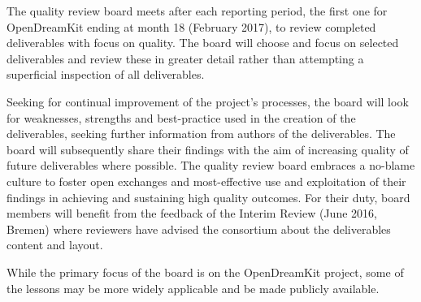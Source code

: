 \documentclass{deliverablereport}
\begin{document}
The quality review board meets after each reporting period, the first
one for OpenDreamKit ending at month 18 (February 2017), to review
completed deliverables with focus on quality. The board will choose
and focus on selected deliverables and review these in greater detail
rather than attempting a superficial inspection of all deliverables.

Seeking for continual improvement of the project's processes, the
board will look for weaknesses, strengths and best-practice used in
the creation of the deliverables, seeking further information from
authors of the deliverables. The board will subsequently share their
findings with the aim of increasing quality of future deliverables
where possible. The quality review board embraces a no-blame culture
to foster open exchanges and most-effective use and exploitation of
their findings in achieving and sustaining high quality outcomes. For
their duty, board members will benefit from the feedback of the
Interim Review (June 2016, Bremen) where reviewers have advised the
\ODK consortium about the deliverables content and layout.

While the primary focus of the board is on the OpenDreamKit project,
some of the lessons may be more widely applicable and be made publicly
available.






\end{document}
